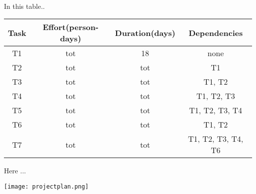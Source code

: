 \\
In this table.. 
\begin{center}
	\begin{tabular}{c c c c}
		\hline
		\textbf{Task} & \textbf{Effort(person-days)} & \textbf{Duration(days)} & \textbf{Dependencies} \\
		\hline
		T1 & tot & 18 & none \\
		T2 & tot & tot & T1 \\
		T3 & tot & tot & T1, T2 \\
		T4 & tot & tot & T1, T2, T3 \\
		T5 & tot & tot & T1, T2, T3, T4 \\
		T6 & tot & tot & T1, T2 \\
		T7 & tot & tot & T1, T2, T3, T4, T6  \\
		\hline
	\end{tabular}
\end{center}
Here ... 
\begin{center}
	\texttt{[image: projectplan.png]}
\end{center}


